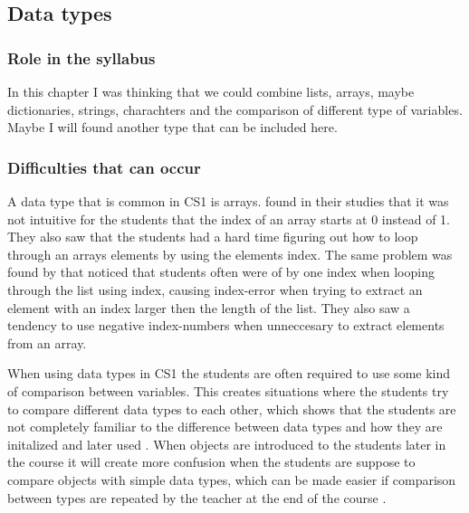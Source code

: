 \subsection{Data types}

\subsubsection{Role in the syllabus}

In this chapter I was thinking that we could combine lists, arrays, maybe dictionaries, strings, charachters and the comparison of different type of variables. Maybe I will found another type that can be included here. 

\subsubsection{Difficulties that can occur}

A data type that is common in CS1 is arrays. \textcite{Kurvinen2016} found in their studies that it was not intuitive for the students that the index of an array starts at 0 instead of 1. They also saw that the students had a hard time figuring out how to loop through an arrays elements by using the elements index. The same problem was found by \textcite{KumarVeerasamy2016} that noticed that students often were of by one index when looping through the list using index, causing index-error when trying to extract an element with an index larger then the length of the list. They also saw a tendency to use negative index-numbers when unneccesary to extract elements from an array. 

When using data types in CS1 the students are often required to use some kind of comparison between variables. This creates situations where the students try to compare different data types to each other, which shows that the students are not completely familiar to the difference between data types and how they are initalized and later used \parencite{Kurvinen2016}. When objects are introduced to the students later in the course it will create more confusion when the students are suppose to compare objects with simple data types, which can be made easier if comparison between types are repeated by the teacher at the end of the course \parencite{Kurvinen2016}. 

